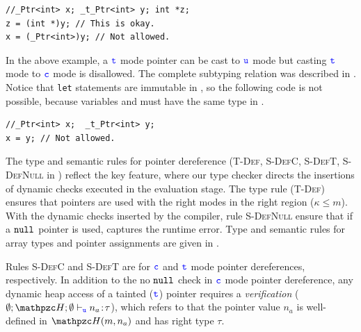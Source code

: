 \begin{verbatim}
//_Ptr<int> x; _t_Ptr<int> y; int *z;
z = (int *)y; // This is okay.
x = (_Ptr<int>)y; // Not allowed.
\end{verbatim}

In the above example, a $\textcolor{blue}{\texttt{t}}$ mode pointer can be cast to $\textcolor{blue}{\texttt{u}}$ mode but casting $\textcolor{blue}{\texttt{t}}$ mode to $\textcolor{blue}{\texttt{c}}$ mode is disallowed.
The complete subtyping relation was described in .
Notice that \texttt{let} statements are immutable in \lang, so the following code is not possible, because variables  and  must have the same type in \lang.

\begin{verbatim}
//_Ptr<int> x;  _t_Ptr<int> y;
x = y; // Not allowed.
\end{verbatim}

The type and semantic rules for pointer dereference (\textsc{T-Def}, \textsc{S-DefC},
\textsc{S-DefT}, \textsc{S-DefNull} in )
reflect the key \lang feature, where our type checker directs the insertions of dynamic checks executed in the evaluation stage.
The type rule (\textsc{T-Def}) ensures that pointers are used with the right modes in the right region ($\kappa \le m$).
With the dynamic checks inserted by the compiler, rule \textsc{S-DefNull} ensure that if a $\mathtt{null}$ pointer is used,
\lang captures the runtime error.
Type and semantic rules for array types and pointer assignments are given in .

Rules \textsc{S-DefC} and \textsc{S-DefT} are for $\textcolor{blue}{\texttt{c}}$ and $\textcolor{blue}{\texttt{t}}$ mode pointer dereferences, respectively.
In addition to the no $\mathtt{null}$ check in $\textcolor{blue}{\texttt{c}}$ mode pointer dereference,
any dynamic heap access of a tainted ($\textcolor{blue}{\texttt{t}}$) pointer requires a \textit{verification} ($\emptyset;\heap ; \emptyset \vdash_{\umode}\evalue{n_a}{\tau}$), which refers to that the pointer value $n_a$ is well-defined in $\heap(m,n_a)$ and has right type $\tau$.


